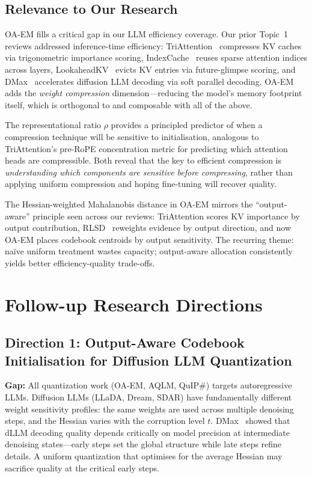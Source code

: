 \documentclass[11pt]{article}
\begin{document}
\subsection{Relevance to Our Research}

OA-EM fills a critical gap in our LLM efficiency coverage. Our prior Topic~1 reviews addressed inference-time efficiency: TriAttention~\cite{triattention} compresses KV caches via trigonometric importance scoring, IndexCache~\cite{indexcache} reuses sparse attention indices across layers, LookaheadKV~\cite{lookaheadkv} evicts KV entries via future-glimpse scoring, and DMax~\cite{dmax} accelerates diffusion LLM decoding via soft parallel decoding. OA-EM adds the \textit{weight compression} dimension---reducing the model's memory footprint itself, which is orthogonal to and composable with all of the above.

The representational ratio $\rho$ provides a principled predictor of when a compression technique will be sensitive to initialisation, analogous to TriAttention's pre-RoPE concentration metric for predicting which attention heads are compressible. Both reveal that the key to efficient compression is \textit{understanding which components are sensitive before compressing}, rather than applying uniform compression and hoping fine-tuning will recover quality.

The Hessian-weighted Mahalanobis distance in OA-EM mirrors the ``output-aware'' principle seen across our reviews: TriAttention scores KV importance by output contribution, RLSD~\cite{rlsd} reweights evidence by output direction, and now OA-EM places codebook centroids by output sensitivity. The recurring theme: na\"ive uniform treatment wastes capacity; output-aware allocation consistently yields better efficiency-quality trade-offs.

\section{Follow-up Research Directions}

\subsection{Direction 1: Output-Aware Codebook Initialisation for Diffusion LLM Quantization}

\textbf{Gap:} All quantization work (OA-EM, AQLM, QuIP\#) targets autoregressive LLMs. Diffusion LLMs (LLaDA, Dream, SDAR) have fundamentally different weight sensitivity profiles: the same weights are used across multiple denoising steps, and the Hessian varies with the corruption level $t$. DMax~\cite{dmax} showed that dLLM decoding quality depends critically on model precision at intermediate denoising states---early steps set the global structure while late steps refine details. A uniform quantization that optimises for the average Hessian may sacrifice quality at the critical early steps.
\end{document}
